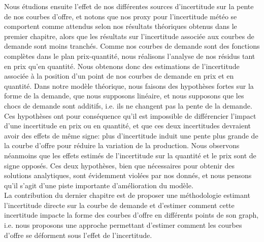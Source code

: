 Nous étudions ensuite l'effet de nos différentes sources d'incertitude sur la pente de nos courbes d'offre, et notons que nos proxy pour l'incertitude météo se comportent comme attendus selon nos résultats théoriques obtenus dans le premier chapitre, alors que les résultats sur l'incertitude associée aux courbes de demande sont moins tranchés. Comme nos courbes de demande sont des fonctions complètes dans le plan prix-quantité, nous réalisons l'analyse de nos résidus tant en prix qu'en quantité. Nous obtenons donc des estimations de l'incertitude associée à la position d'un point de nos courbes de demande en prix et en quantité. Dans notre modèle théorique, nous faisons des hypothèses fortes sur la forme de la demande, que nous supposons linéaire, et nous supposons que les chocs de demande sont additifs, i.e. ils ne changent pas la pente de la demande. Ces hypothèses ont pour conséquence qu'il est impossible de différencier l'impact d'une incertitude en prix ou en quantité, et que ces deux incertitudes devraient avoir des effets de même signe: plus d'incertitude induit une pente plus grande de la courbe d'offre pour réduire la variation de la production. Nous observons néanmoins que les effets estimés de l'incertitude sur la quantité et le prix sont de signe opposés. Ces deux hypothèses, bien que nécessaires pour obtenir des solutions analytiques, sont évidemment violées par nos donnés, et nous pensons qu'il s'agit d'une piste importante d'amélioration du modèle.\\

La contribution du dernier chapitre est de proposer une méthodologie estimant l'incertitude directe sur la courbe de demande et d'estimer comment cette incertitude impacte la forme des courbes d'offre en différents points de son graph, i.e. nous proposons une approche permettant d'estimer comment les courbes d'offre se déforment sous l'effet de l'incertitude.\\



 